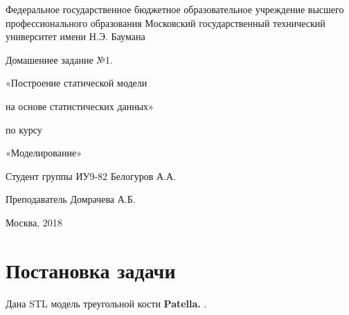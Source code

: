 \documentclass[a4paper, 12pt]{article}   	%
\begin{document}
\begin{titlepage}

\thispagestyle{empty}

\begin{center}
Федеральное государственное бюджетное образовательное учреждение высшего профессионального образования Московский государственный технический университет имени Н.Э. Баумана
\end{center}


\vfill

\centerline{\large{Домашениее задание №1.}}

\centerline{\large{«Построение статической модели}}
\centerline{\large{на основе статистических данных»}}

\centerline{\large{по курсу}}
\centerline{\large{«Моделирование»}}


\vfill

Студент группы ИУ9-82 \hfill Белогуров А.А.

Преподаватель \hfill Домрачева А.Б.
\vfill

\centerline{Москва, 2018}
\clearpage
\end{titlepage}

\newpage
\setcounter{page}{2}

\tableofcontents

\newpage

\section{Постановка задачи}
    Дана STL модель треугольной кости \textbf{Patella.} \cite{stl-url}.
    
\end{document}
